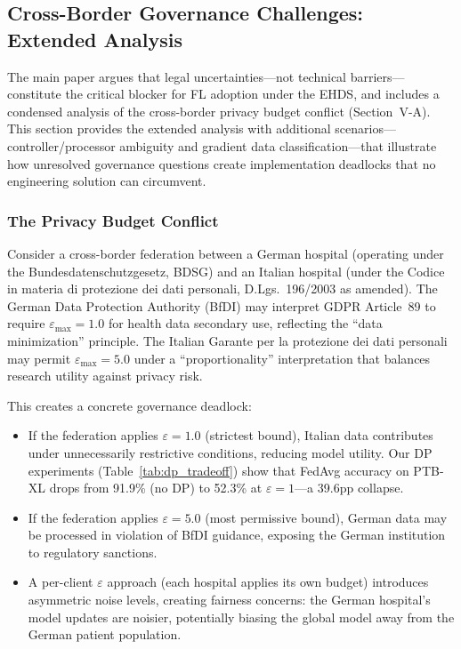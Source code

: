 \documentclass[conference]{IEEEtran}
\begin{document}
\subsection{Cross-Border Governance Challenges: Extended Analysis}
\label{sec:governance_challenges}

The main paper argues that legal uncertainties---not technical barriers---constitute the critical blocker for FL adoption under the EHDS, and includes a condensed analysis of the cross-border privacy budget conflict (Section~V-A). This section provides the extended analysis with additional scenarios---controller/processor ambiguity and gradient data classification---that illustrate how unresolved governance questions create implementation deadlocks that no engineering solution can circumvent.

\subsubsection{The Privacy Budget Conflict}

Consider a cross-border federation between a German hospital (operating under the Bundesdatenschutzgesetz, BDSG) and an Italian hospital (under the Codice in materia di protezione dei dati personali, D.Lgs.~196/2003 as amended). The German Data Protection Authority (BfDI) may interpret GDPR Article~89 to require $\varepsilon_{\max} = 1.0$ for health data secondary use, reflecting the ``data minimization'' principle. The Italian Garante per la protezione dei dati personali may permit $\varepsilon_{\max} = 5.0$ under a ``proportionality'' interpretation that balances research utility against privacy risk.

This creates a concrete governance deadlock:
\begin{itemize}
    \item If the federation applies $\varepsilon = 1.0$ (strictest bound), Italian data contributes under unnecessarily restrictive conditions, reducing model utility. Our DP experiments (Table~\ref{tab:dp_tradeoff}) show that FedAvg accuracy on PTB-XL drops from 91.9\% (no DP) to 52.3\% at $\varepsilon = 1$---a 39.6pp collapse.
    \item If the federation applies $\varepsilon = 5.0$ (most permissive bound), German data may be processed in violation of BfDI guidance, exposing the German institution to regulatory sanctions.
    \item A per-client $\varepsilon$ approach (each hospital applies its own budget) introduces asymmetric noise levels, creating fairness concerns: the German hospital's model updates are noisier, potentially biasing the global model away from the German patient population.
\end{itemize}
\end{document}
